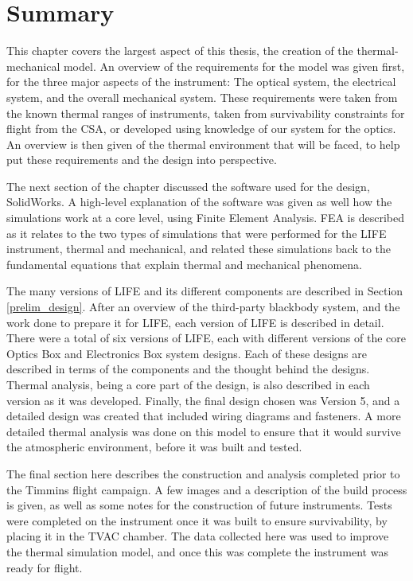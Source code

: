 \section{Summary}
This chapter covers the largest aspect of this thesis, the creation of the thermal-mechanical model. An overview of the requirements for the model was given first, for the three major aspects of the instrument: The optical system, the electrical system, and the overall mechanical system. These requirements were taken from the known thermal ranges of instruments, taken from survivability constraints for flight from the CSA, or developed using knowledge of our system for the optics. An overview is then given of the thermal environment that will be faced, to help put these requirements and the design into perspective.

The next section of the chapter discussed the software used for the design, SolidWorks. A high-level explanation of the software was given as well how the simulations work at a core level, using Finite Element Analysis. FEA is described as it relates to the two types of simulations that were performed for the LIFE instrument, thermal and mechanical, and related these simulations back to the fundamental equations that explain thermal and mechanical phenomena.

The many versions of LIFE and its different components are described in Section \ref{prelim_design}. After an overview of the third-party blackbody system, and the work done to prepare it for LIFE, each version of LIFE is described in detail. There were a total of six versions of LIFE, each with different versions of the core Optics Box and Electronics Box system designs. Each of these designs are described in terms of the components and the thought behind the designs. Thermal analysis, being a core part of the design, is also described in each version as it was developed. Finally, the final design chosen was Version 5, and a detailed design was created that included wiring diagrams and fasteners. A more detailed thermal analysis was done on this model to ensure that it would survive the atmospheric environment, before it was built and tested.

The final section here describes the construction and analysis completed prior to the Timmins flight campaign. A few images and a description of the build process is given, as well as some notes for the construction of future instruments. Tests were completed on the instrument once it was built to ensure survivability, by placing it in the TVAC chamber. The data collected here was used to improve the thermal simulation model, and once this was complete the instrument was ready for flight.